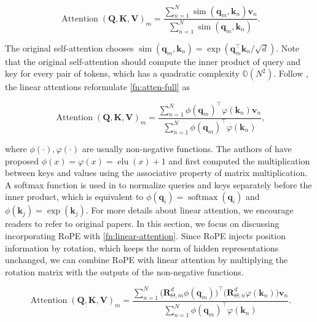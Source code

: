 \begin{equation}
	\operatorname{Attention}(\mathbf{Q},\mathbf{K},\mathbf{V})_m=\frac{\sum_{n=1}^{N}\operatorname{sim}({\boldsymbol q}_m,{\boldsymbol k}_n){\boldsymbol v}_n}{\sum_{n=1}^{N}\operatorname{sim}({\boldsymbol q}_m, {\boldsymbol k}_n)}.
	\label{fn:atten-full}
\end{equation}

The original self-attention chooses $\operatorname{sim}({\boldsymbol q}_m,{\boldsymbol k}_n)=\exp({\boldsymbol q}_m^{\intercal}{\boldsymbol k}_n/\sqrt{d})$. Note that the original self-attention should compute the inner product of query and key for every pair of tokens, which has a quadratic complexity $\mathbb{O}(N^2)$.  Follow \cite{katharopoulos2020transformers}, the linear attentions reformulate \ref{fn:atten-full} as

\begin{equation}
	\operatorname{Attention}({\boldsymbol Q},{\boldsymbol K},{\boldsymbol V})_m=\frac{\sum_{n=1}^{N}\phi({\boldsymbol q}_m)^{\intercal}\varphi({\boldsymbol k}_n){\boldsymbol v}_n}{\sum_{n=1}^{N}\phi({\boldsymbol q}_m)^{\intercal}\varphi({\boldsymbol k}_n)},
	\label{fn:linear-attention}
\end{equation}

where $\phi(\cdot), \varphi(\cdot)$ are usually non-negative functions. The authors of \cite{katharopoulos2020transformers} have proposed $\phi(x)=\varphi(x)=\operatorname{elu}(x)+1$ and first computed the multiplication between keys and values using the associative property of matrix multiplication.  A softmax function is used in \cite{shen2021efficient} to normalize queries and keys separately before the inner product, which is equivalent to   $\phi({\boldsymbol q}_i)=\operatorname{softmax}({\boldsymbol q}_i)$ and $\phi({\boldsymbol k}_j)=\exp({\boldsymbol k}_j)$. For more details about linear attention, we encourage readers to refer to original papers. In this section, we focus on discussing incorporating RoPE with \ref{fn:linear-attention}. Since RoPE injects position information by rotation, which keeps the norm of hidden representations unchanged, we can combine RoPE with linear attention by multiplying the rotation matrix with the outputs of the non-negative functions.

\begin{equation}
	\operatorname{Attention}(\mathbf{Q},\mathbf{K},\mathbf{V})_m=\frac{\sum_{n=1}^{N}\big({\boldsymbol R}^d_{\Theta, m}\phi({\boldsymbol q}_m)\big)^{\intercal}\big({\boldsymbol R}^d_{\Theta, n}\varphi({\boldsymbol k}_n)\big){\boldsymbol v}_n}{\sum_{n=1}^{N}\phi({\boldsymbol q}_m)^{\intercal}\varphi({\boldsymbol k}_n)}.
	\label{fn:linear-rope}
\end{equation}

